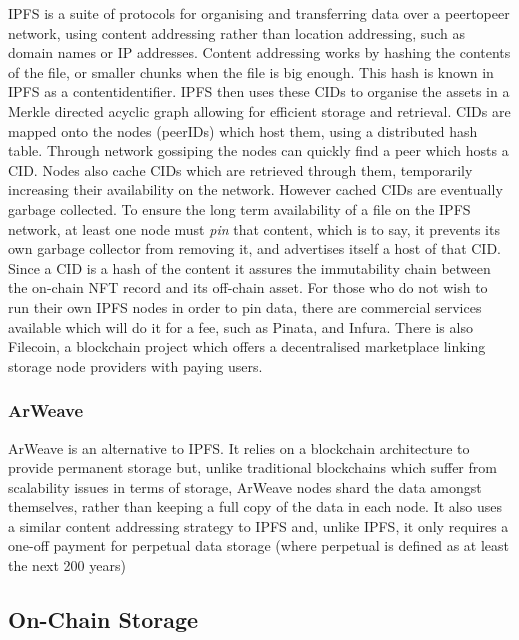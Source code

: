 IPFS is a suite of protocols for organising and transferring data over a \gls{peertopeer} network, using content addressing rather than location addressing, such as domain names or IP addresses.
Content addressing works by hashing the contents of the file, or smaller chunks when the file is big enough. This hash is known in IPFS as a \gls{contentidentifier}. IPFS then uses these CIDs to organise the assets in a Merkle \gls{directed acyclic graph} allowing for efficient storage and retrieval.
CIDs are mapped onto the nodes (peerIDs) which host them, using a \gls{distributed hash table}. Through network gossiping the nodes can quickly find a peer which hosts a CID. Nodes also cache CIDs which are retrieved through them, temporarily increasing their availability on the network.
However cached CIDs are eventually garbage collected. To ensure the long term availability of a file on the IPFS network, at least one node must \emph{pin} that content, which is to say, it prevents its own garbage collector from removing it, and advertises itself a host of that CID.
Since a CID is a hash of the content it assures the immutability chain between the on-chain NFT record and its off-chain asset.
For those who do not wish to run their own IPFS nodes in order to pin data, there are commercial services available which will do it for a fee, such as Pinata\footnotemark[1], and Infura\footnotemark[2]. There is also Filecoin\footnotemark[3], a blockchain project which offers a decentralised marketplace linking storage node providers with paying users.


\subsubsection{ArWeave}
\label{sec:arweave}

ArWeave is an alternative to IPFS. It relies on a blockchain architecture to provide permanent storage but, unlike traditional blockchains which suffer from scalability issues in terms of storage, ArWeave nodes shard the data amongst themselves, rather than keeping a full copy of the data in each node.
It also uses a similar content addressing strategy to IPFS and, unlike IPFS, it only requires a one-off payment for perpetual data storage (where perpetual is defined as at least the next 200 years) \needcite

\subsection{On-Chain Storage}

